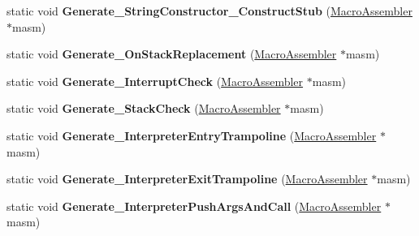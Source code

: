 \begin{DoxyCompactItemize}
\item 
static void {\bfseries Generate\+\_\+\+String\+Constructor\+\_\+\+Construct\+Stub} (\hyperlink{classv8_1_1internal_1_1_macro_assembler}{Macro\+Assembler} $\ast$masm)\hypertarget{classv8_1_1internal_1_1_builtins_ac48c7e49deb1e095748d1869cd975c0c}{}\label{classv8_1_1internal_1_1_builtins_ac48c7e49deb1e095748d1869cd975c0c}

\item 
static void {\bfseries Generate\+\_\+\+On\+Stack\+Replacement} (\hyperlink{classv8_1_1internal_1_1_macro_assembler}{Macro\+Assembler} $\ast$masm)\hypertarget{classv8_1_1internal_1_1_builtins_a5150a975b77920c64f7041350506f61e}{}\label{classv8_1_1internal_1_1_builtins_a5150a975b77920c64f7041350506f61e}

\item 
static void {\bfseries Generate\+\_\+\+Interrupt\+Check} (\hyperlink{classv8_1_1internal_1_1_macro_assembler}{Macro\+Assembler} $\ast$masm)\hypertarget{classv8_1_1internal_1_1_builtins_a237dc45c2140ba1a382ddd9ed895d57a}{}\label{classv8_1_1internal_1_1_builtins_a237dc45c2140ba1a382ddd9ed895d57a}

\item 
static void {\bfseries Generate\+\_\+\+Stack\+Check} (\hyperlink{classv8_1_1internal_1_1_macro_assembler}{Macro\+Assembler} $\ast$masm)\hypertarget{classv8_1_1internal_1_1_builtins_ae6b37ca182b8e724236a1bcd9804dd95}{}\label{classv8_1_1internal_1_1_builtins_ae6b37ca182b8e724236a1bcd9804dd95}

\item 
static void {\bfseries Generate\+\_\+\+Interpreter\+Entry\+Trampoline} (\hyperlink{classv8_1_1internal_1_1_macro_assembler}{Macro\+Assembler} $\ast$masm)\hypertarget{classv8_1_1internal_1_1_builtins_ae8bea060e216ad3b4d008916b78cf830}{}\label{classv8_1_1internal_1_1_builtins_ae8bea060e216ad3b4d008916b78cf830}

\item 
static void {\bfseries Generate\+\_\+\+Interpreter\+Exit\+Trampoline} (\hyperlink{classv8_1_1internal_1_1_macro_assembler}{Macro\+Assembler} $\ast$masm)\hypertarget{classv8_1_1internal_1_1_builtins_a6ca409abfd7ace8cf15f4cc7c6893b37}{}\label{classv8_1_1internal_1_1_builtins_a6ca409abfd7ace8cf15f4cc7c6893b37}

\item 
static void {\bfseries Generate\+\_\+\+Interpreter\+Push\+Args\+And\+Call} (\hyperlink{classv8_1_1internal_1_1_macro_assembler}{Macro\+Assembler} $\ast$masm)\hypertarget{classv8_1_1internal_1_1_builtins_ae5e0dc43e599bfe28acea2ec5a795cb6}{}\label{classv8_1_1internal_1_1_builtins_ae5e0dc43e599bfe28acea2ec5a795cb6}


\end{DoxyCompactItemize}
